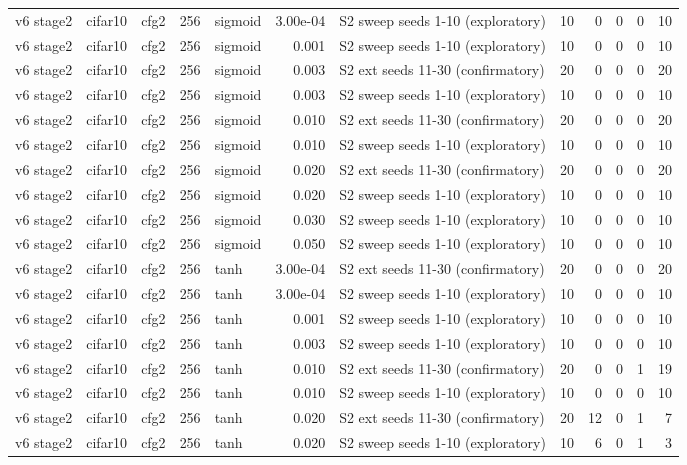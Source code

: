 \begin{table}[htbp]
{\begin{tabular}{@{}lllrlrlrrrrr@{}}
v6 stage2 & cifar10 & cfg2 & 256 & sigmoid & 3.00e-04 & S2 sweep seeds 1-10 (exploratory) & 10 & 0 & 0 & 0 & 10 \\
v6 stage2 & cifar10 & cfg2 & 256 & sigmoid & 0.001 & S2 sweep seeds 1-10 (exploratory) & 10 & 0 & 0 & 0 & 10 \\
v6 stage2 & cifar10 & cfg2 & 256 & sigmoid & 0.003 & S2 ext seeds 11-30 (confirmatory) & 20 & 0 & 0 & 0 & 20 \\
v6 stage2 & cifar10 & cfg2 & 256 & sigmoid & 0.003 & S2 sweep seeds 1-10 (exploratory) & 10 & 0 & 0 & 0 & 10 \\
v6 stage2 & cifar10 & cfg2 & 256 & sigmoid & 0.010 & S2 ext seeds 11-30 (confirmatory) & 20 & 0 & 0 & 0 & 20 \\
v6 stage2 & cifar10 & cfg2 & 256 & sigmoid & 0.010 & S2 sweep seeds 1-10 (exploratory) & 10 & 0 & 0 & 0 & 10 \\
v6 stage2 & cifar10 & cfg2 & 256 & sigmoid & 0.020 & S2 ext seeds 11-30 (confirmatory) & 20 & 0 & 0 & 0 & 20 \\
v6 stage2 & cifar10 & cfg2 & 256 & sigmoid & 0.020 & S2 sweep seeds 1-10 (exploratory) & 10 & 0 & 0 & 0 & 10 \\
v6 stage2 & cifar10 & cfg2 & 256 & sigmoid & 0.030 & S2 sweep seeds 1-10 (exploratory) & 10 & 0 & 0 & 0 & 10 \\
v6 stage2 & cifar10 & cfg2 & 256 & sigmoid & 0.050 & S2 sweep seeds 1-10 (exploratory) & 10 & 0 & 0 & 0 & 10 \\
v6 stage2 & cifar10 & cfg2 & 256 & tanh & 3.00e-04 & S2 ext seeds 11-30 (confirmatory) & 20 & 0 & 0 & 0 & 20 \\
v6 stage2 & cifar10 & cfg2 & 256 & tanh & 3.00e-04 & S2 sweep seeds 1-10 (exploratory) & 10 & 0 & 0 & 0 & 10 \\
v6 stage2 & cifar10 & cfg2 & 256 & tanh & 0.001 & S2 sweep seeds 1-10 (exploratory) & 10 & 0 & 0 & 0 & 10 \\
v6 stage2 & cifar10 & cfg2 & 256 & tanh & 0.003 & S2 sweep seeds 1-10 (exploratory) & 10 & 0 & 0 & 0 & 10 \\
v6 stage2 & cifar10 & cfg2 & 256 & tanh & 0.010 & S2 ext seeds 11-30 (confirmatory) & 20 & 0 & 0 & 1 & 19 \\
v6 stage2 & cifar10 & cfg2 & 256 & tanh & 0.010 & S2 sweep seeds 1-10 (exploratory) & 10 & 0 & 0 & 0 & 10 \\
v6 stage2 & cifar10 & cfg2 & 256 & tanh & 0.020 & S2 ext seeds 11-30 (confirmatory) & 20 & 12 & 0 & 1 & 7 \\
v6 stage2 & cifar10 & cfg2 & 256 & tanh & 0.020 & S2 sweep seeds 1-10 (exploratory) & 10 & 6 & 0 & 1 & 3 \\

\end{tabular}}
\end{table}
